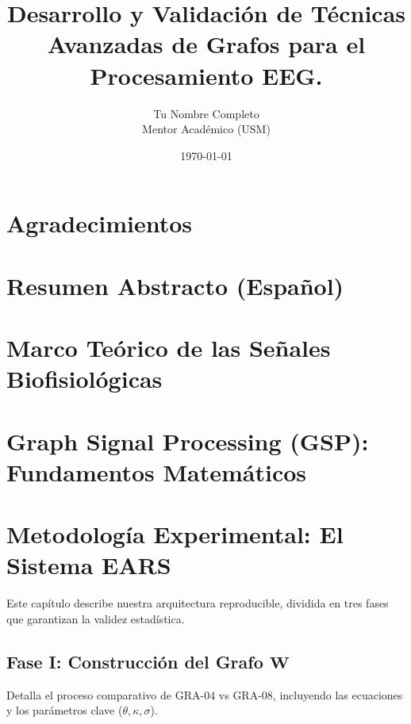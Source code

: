 \documentclass[a4paper, 12pt]{book}
\title{Desarrollo y Validación de Técnicas Avanzadas de Grafos para el Procesamiento EEG.}
\author{Tu Nombre Completo\\Mentor Académico (USM)}
\date{\today}
\begin{document}
\maketitle

\chapter*{Agradecimientos} %

\chapter*{Resumen Abstracto (Español)} %


\tableofcontents %

\chapter{Marco Teórico de las Señales Biofisiológicas}
\label{cap:marco_teorico}

\chapter{Graph Signal Processing (GSP): Fundamentos Matemáticos}
\label{cap:gsp_teorico}

\chapter{Metodología Experimental: El Sistema EARS}
\label{cap:metodologia_experimental}
Este capítulo describe nuestra arquitectura reproducible, dividida en tres fases que garantizan la validez estadística.

\section{Fase I: Construcción del Grafo $\mathbf{W}$}
\label{sec:grafos_w}
Detalla el proceso comparativo de $\text{GRA-04}$ vs $\text{GRA-08}$, incluyendo las ecuaciones y los parámetros clave ($\theta, \kappa, \sigma$).
\end{document}
